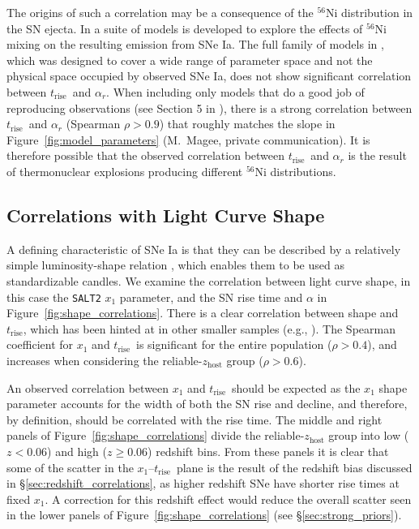 \documentclass[twocolumn]{aastex63}
\newcommand{\trise}{$t_\mathrm{rise}$}
\begin{document}
The origins of such a correlation may be a consequence of the $^{56}$Ni
distribution in the SN ejecta. In \citet{Magee19} a suite of models is
developed to explore the effects of $^{56}$Ni mixing on the resulting emission
from SNe Ia. The full family of models in \citet{Magee19}, which was designed
to cover a wide range of parameter space and not the physical space occupied
by observed SNe Ia, does not show significant correlation between \trise\ and
$\alpha_r$. When including only models that do a good job of reproducing
observations (see Section 5 in \citealt{Magee19}), there is a strong
correlation between \trise\ and $\alpha_r$ (Spearman $\rho > 0.9$) that
roughly matches the slope in Figure~\ref{fig:model_parameters} (M.~Magee,
private communication). It is therefore possible that the observed correlation
between \trise\ and $\alpha_r$ is the result of thermonuclear explosions
producing different $^{56}$Ni distributions.

\subsection{Correlations with Light Curve Shape}

A defining characteristic of SNe Ia is that they can be described by a
relatively simple luminosity-shape relation \citep{Phillips93}, which enables
them to be used as standardizable candles. We examine the correlation between
light curve shape, in this case the \texttt{SALT2} $x_1$ parameter, and the SN
rise time and $\alpha$ in Figure~\ref{fig:shape_correlations}. There is a clear
correlation between shape and \trise, which has been hinted at in other smaller
samples (e.g., \citealt{Riess99a,Firth15,Zheng17a}). The Spearman coefficient
for $x_1$ and \trise\ is significant for the entire population ($\rho > 0.4$),
and increases when considering the reliable-$z_\mathrm{host}$ group ($\rho >
0.6$).

An observed correlation between $x_1$ and \trise\ should be expected as the
$x_1$ shape parameter accounts for the width of both the SN rise and decline,
and therefore, by definition, should be correlated with the rise time. The
middle and right panels of Figure~\ref{fig:shape_correlations} divide the
reliable-$z_\mathrm{host}$ group into low ($z < 0.06$) and high ($z \ge 0.06$)
redshift bins. From these panels it is clear that some of the scatter in the
$x_1$--\trise\ plane is the result of the redshift bias discussed in
\S\ref{sec:redshift_correlations}, as higher redshift SNe have shorter rise
times at fixed $x_1$. A correction for this redshift effect would reduce the
overall scatter seen in the lower panels of
Figure~\ref{fig:shape_correlations} (see \S\ref{sec:strong_priors}).
\end{document}
